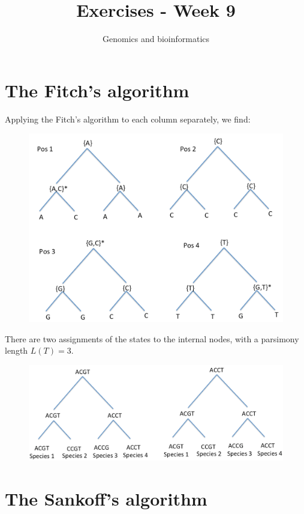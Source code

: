 \documentclass[a4paper,11pt]{article}
\title{Exercises - Week 9}
\date{}
\author{Genomics and bioinformatics}
\begin{document}
\maketitle

\section{The Fitch's algorithm}

\noindent Applying the Fitch's algorithm to each column separately, we find:
\begin{figure}[h!]
\centering\includegraphics[width=14cm]{Fig1.png}
\end{figure}

\noindent There are two assignments of the states to the internal nodes, with a parsimony length $L(T)=3$.
\begin{figure}[h!]
\centering\includegraphics[width=14cm]{Fig2.png}
\end{figure}

\section{The Sankoff's algorithm}
\end{document}
